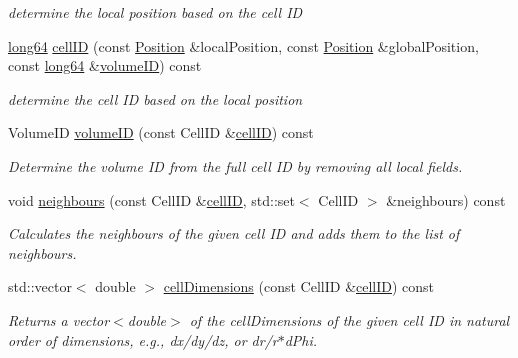 \begin{DoxyCompactItemize}
\begin{DoxyCompactList}\small\item\em determine the local position based on the cell ID \end{DoxyCompactList}\item 
\hyperlink{namespace_d_d4hep_ac2a70e722b33dc7ddaa20db8954ac836}{long64} \hyperlink{class_d_d4hep_1_1_geometry_1_1_segmentation_a39785430e3bf6f2de6df12f94cdcafe1}{cell\+ID} (const \hyperlink{namespace_d_d4hep_1_1_geometry_a55083902099d03506c6db01b80404900}{Position} \&local\+Position, const \hyperlink{namespace_d_d4hep_1_1_geometry_a55083902099d03506c6db01b80404900}{Position} \&global\+Position, const \hyperlink{namespace_d_d4hep_ac2a70e722b33dc7ddaa20db8954ac836}{long64} \&\hyperlink{class_d_d4hep_1_1_geometry_1_1_segmentation_a0a9c55a7cfce856dd4919ce7b37aef02}{volume\+ID}) const
\begin{DoxyCompactList}\small\item\em determine the cell ID based on the local position \end{DoxyCompactList}\item 
Volume\+ID \hyperlink{class_d_d4hep_1_1_geometry_1_1_segmentation_a0a9c55a7cfce856dd4919ce7b37aef02}{volume\+ID} (const Cell\+ID \&\hyperlink{class_d_d4hep_1_1_geometry_1_1_segmentation_a39785430e3bf6f2de6df12f94cdcafe1}{cell\+ID}) const
\begin{DoxyCompactList}\small\item\em Determine the volume ID from the full cell ID by removing all local fields. \end{DoxyCompactList}\item 
void \hyperlink{class_d_d4hep_1_1_geometry_1_1_segmentation_a2de3f25677347022a2741c7a203c8d6f}{neighbours} (const Cell\+ID \&\hyperlink{class_d_d4hep_1_1_geometry_1_1_segmentation_a39785430e3bf6f2de6df12f94cdcafe1}{cell\+ID}, std\+::set$<$ Cell\+ID $>$ \&neighbours) const
\begin{DoxyCompactList}\small\item\em Calculates the neighbours of the given cell ID and adds them to the list of neighbours. \end{DoxyCompactList}\item 
std\+::vector$<$ double $>$ \hyperlink{class_d_d4hep_1_1_geometry_1_1_segmentation_adf4cbe07d7bb13303704ecff724721dd}{cell\+Dimensions} (const Cell\+ID \&\hyperlink{class_d_d4hep_1_1_geometry_1_1_segmentation_a39785430e3bf6f2de6df12f94cdcafe1}{cell\+ID}) const
\begin{DoxyCompactList}\small\item\em Returns a vector$<$double$>$ of the cell\+Dimensions of the given cell ID in natural order of dimensions, e.\+g., dx/dy/dz, or dr/r$\ast$d\+Phi. \end{DoxyCompactList}\item 

\end{DoxyCompactItemize}
